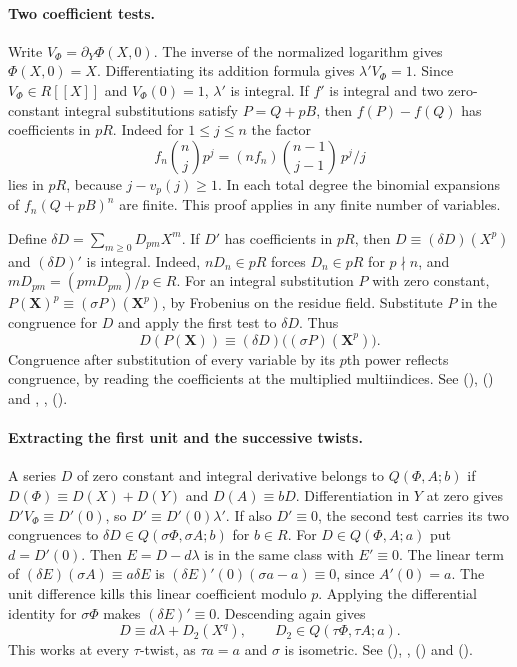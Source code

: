 \paragraph{Two coefficient tests.}
Write $V_\Phi=\partial_Y\Phi(X,0)$. The inverse of the normalized
logarithm gives $\Phi(X,0)=X$. Differentiating its addition formula
gives $\lambda'V_\Phi=1$. Since $V_\Phi\in R[[X]]$ and $V_\Phi(0)=1$,
$\lambda'$ is integral. If $f'$ is integral and two zero-constant
integral substitutions satisfy $P=Q+pB$, then $f(P)-f(Q)$ has
coefficients in $pR$. Indeed for $1\le j\le n$ the factor
\[
 f_n {n\choose j}p^j=(nf_n){n-1\choose j-1}\,p^j/j
\]
lies in $pR$, because $j-v_p(j)\ge1$. In each total degree the
binomial expansions of $f_n(Q+pB)^n$ are finite. This proof applies
in any finite number of variables.

Define $\delta D=\sum_{m\ge0}D_{pm}X^m$. If $D'$ has coefficients
in $pR$, then $D\equiv(\delta D)(X^p)$ and $(\delta D)'$ is
integral. Indeed, $nD_n\in pR$ forces $D_n\in pR$ for $p\nmid n$,
and $mD_{pm}=(pmD_{pm})/p\in R$. For an integral substitution
$P$ with zero constant,
$P(\mathbf X)^p\equiv(\sigma P)(\mathbf X^p)$, by Frobenius on
the residue field. Substitute $P$ in the congruence for $D$ and
apply the first test to $\delta D$. Thus
\[
 D(P(\mathbf X))\equiv(\delta D)\big((\sigma P)(\mathbf X^p)\big).
\]
Congruence after substitution of every variable by its $p$th power
reflects congruence, by reading the coefficients at the multiplied
multiindices. See  (),
 () and ,
,  ().

\paragraph{Extracting the first unit and the successive twists.}
A series $D$ of zero constant and integral derivative belongs to
$Q(\Phi,A;b)$ if $D(\Phi)\equiv D(X)+D(Y)$ and $D(A)\equiv bD$.
Differentiation in $Y$ at zero gives
$D'V_\Phi\equiv D'(0)$, so $D'\equiv D'(0)\lambda'$.
If also $D'\equiv0$, the second test carries its two congruences
to $\delta D\in Q(\sigma\Phi,\sigma A;b)$ for $b\in R$.
For $D\in Q(\Phi,A;a)$ put $d=D'(0)$. Then $E=D-d\lambda$
is in the same class with $E'\equiv0$.
The linear term of $(\delta E)(\sigma A)\equiv a\delta E$
is $(\delta E)'(0)(\sigma a-a)\equiv0$, since $A'(0)=a$.
The unit difference kills this linear coefficient modulo $p$.
Applying the differential identity for $\sigma\Phi$ makes
$(\delta E)'\equiv0$. Descending again gives
\[
 D\equiv d\lambda+D_2(X^q),\qquad
 D_2\in Q(\tau\Phi,\tau A;a).
\]
This works at every $\tau$-twist, as $\tau a=a$ and $\sigma$ is
isometric. See  (),
,  ()
and  ().

